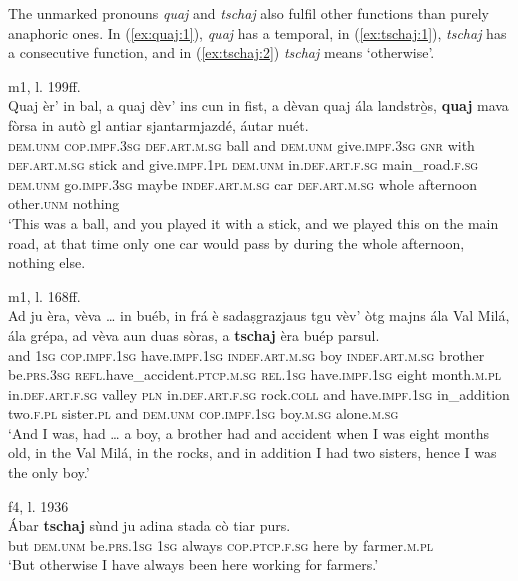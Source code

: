 The unmarked pronouns \textit{quaj} and \textit{tschaj}  also fulfil other functions than purely anaphoric ones. In (\ref{ex:quaj:1}), \textit{quaj} has a temporal, in (\ref{ex:tschaj:1}), \textit{tschaj} has a consecutive function, and in (\ref{ex:tschaj:2}) \textit{tschaj} means `otherwise'.

\ea\label{ex:quaj:1}
 {m1, l. 199ff.}\\
\gll    Quaj èr’ in bal, a quaj dèv’ ins cun in fist, a dèvan quaj ála  landstrò̱s, \textbf{quaj} mava fòrsa in autò gl antiar sjantarmjazdé, áutar nuét.\\
\textsc{dem.unm} \textsc{cop.impf.3sg} \textsc{def.art.m.sg} ball and \textsc{dem.unm} give.\textsc{impf.3sg} \textsc{gnr} with \textsc{def.art.m.sg} stick and give.\textsc{impf.1pl} \textsc{dem.unm} in.\textsc{def.art.f.sg} main\_road.\textsc{f.sg} \textsc{dem.unm} go.\textsc{impf.3sg} maybe \textsc{indef.art.m.sg} car \textsc{def.art.m.sg} whole afternoon other.\textsc{unm} nothing\\
\glt `This was a ball, and you played it with a stick, and we played this on the main road, at that time only one car would pass by during the whole afternoon, nothing else.
\z

\ea
\label{ex:tschaj:1}
 {m1, l. 168ff.}\\
\gll    Ad ju èra, vèva … in buéb, in frá è sadaṣgrazjaus tgu vèv’ òtg majns ála Val Milá, ála grépa, ad vèva aun duas sòras, a \textbf{tschaj} èra buép parsul. \\
and \textsc{1sg} \textsc{cop.impf.1sg} have.\textsc{impf.1sg} {} \textsc{indef.art.m.sg} boy \textsc{indef.art.m.sg} brother be.\textsc{prs.3sg} \textsc{refl}.have\_accident.\textsc{ptcp.m.sg} \textsc{rel.1sg} have.\textsc{impf.1sg} eight month.\textsc{m.pl} in.\textsc{def.art.f.sg} valley \textsc{pln} in.\textsc{def.art.f.sg} rock.\textsc{coll} and have.\textsc{impf.1sg} in\_addition two.\textsc{f.pl} sister.\textsc{pl} and \textsc{dem.unm}  \textsc{cop.impf.1sg} boy.\textsc{m.sg} alone.\textsc{m.sg}\\
\glt `And I was, had … a boy, a brother had and accident when I was eight months old, in the Val Milá, in the rocks, and in addition I had two sisters, hence I was the only boy.'
\z 

\ea
\label{ex:tschaj:2}
 {f4, l. 1936}\\
	\gll  Ábar \textbf{tschaj} sùnd ju adina stada cò tiar purs.\\
but \textsc{dem.unm} be.\textsc{prs.1sg} \textsc{1sg} always \textsc{cop.ptcp.f.sg} here by farmer.\textsc{m.pl}\\
\glt `But otherwise I have always been here working for farmers.'
\z

